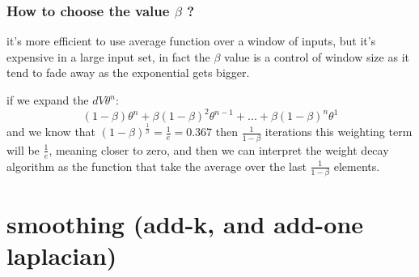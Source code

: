 \documentclass[4apaper,12pt]{book}
\begin{document}
\begin{appendices}
\begin{description}
    \subsection {How to choose the value $\beta$ ?}
    \begin{description}
    \item it's more efficient to use average function over a window of inputs, but it's expensive in a large input set, in fact the $\beta$ value is a control of window size as it tend to fade away as the exponential gets bigger.
    \item if we expand the $dV\theta^n$: $$
      (1-\beta)\theta^{n} + \beta(1-\beta)^2\theta^{n-1} + ... + \beta(1-\beta)^{n}\theta^1
      $$ and we know that $(1-\beta)^{\frac{1}{\beta}} = \frac{1}{e} = 0.367$ then $\frac{1}{1-\beta}$ iterations this weighting term will be $\frac{1}{e}$, meaning closer to zero, and then we can interpret the weight decay algorithm as the function that take the average over the last $\frac{1}{1-\beta}$ elements.

    \end{description}
  \end{description}
  \chapter{smoothing (add-k, and add-one laplacian)}

\end{appendices}
\end{document}

